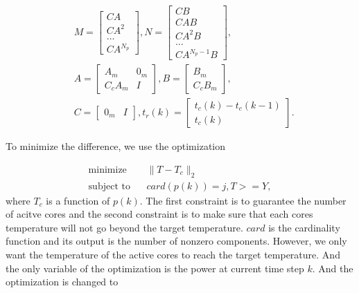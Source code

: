 \begin{equation}
\label{V}
\begin{split}
&M=\begin{bmatrix} CA \\ CA^2\\ \dotsc\\ CA^{N_p} \end{bmatrix}, N=\begin{bmatrix} CB \\CAB \\CA^2B \\ \dotsc \\ CA^{N_p-1}B \end{bmatrix},\\
&A=\begin{bmatrix} A_m & 0_m\\C_cA_m & I \end{bmatrix},B=\begin{bmatrix} B_m\\C_cB_m \end{bmatrix},\\
&C=\begin{bmatrix} 0_m & I \end{bmatrix},t_r(k)=\begin{bmatrix} t_c(k)-t_c(k-1) \\t_c(k) \end{bmatrix}.
\end{split}
\end{equation}

 To minimize the difference, we use the optimization \cite{Wang:MPC_BOOK'09}


\begin{equation}
\begin{split}
\text{minimize} &~~~~\parallel T-T_c \parallel_2\\
\text{subject to} &~~~~ card(p(k))=j,T>=Y,
\end{split}
\end{equation}
where $T_c$ is a function of $p(k)$. 
The first constraint is to guarantee the number of acitve cores and the second constraint is to make sure that each cores temperature will not go beyond the target temperature. $card$ is the cardinality function and its output is the number of nonzero components.
However, we only want the temperature of the active cores to reach the target temperature. And the only variable of the optimization is the power at current time step $k$. And the optimization \cite{Stephen:Convex_BOOK'09} is changed to

